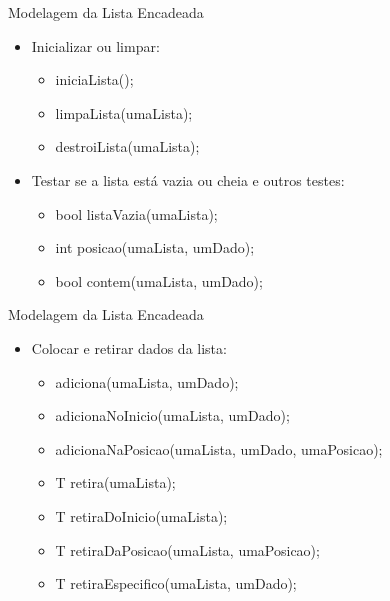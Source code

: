 \documentclass[12pt,table,xcolor={dvipsnames}]{beamer}
\begin{document}
\begin{frame}[fragile]{Modelagem da Lista Encadeada}

\begin{itemize}
\item Inicializar ou limpar:
\begin{itemize}
\item iniciaLista();
\item limpaLista(umaLista);
\item destroiLista(umaLista);
\end{itemize}
\item Testar se a lista está vazia ou cheia e outros testes:
\begin{itemize}
\item bool listaVazia(umaLista);
\item int posicao(umaLista, umDado);
\item bool contem(umaLista, umDado);
\end{itemize}
\end{itemize}
\end{frame}

\begin{frame}[fragile]{Modelagem da Lista Encadeada}

\begin{itemize}
\item Colocar e retirar dados da lista:
\begin{itemize}
\item adiciona(umaLista, umDado);
\item adicionaNoInicio(umaLista, umDado);
\item adicionaNaPosicao(umaLista, umDado, umaPosicao);
\item T retira(umaLista);
\item T retiraDoInicio(umaLista);
\item T retiraDaPosicao(umaLista, umaPosicao);
\item T retiraEspecifico(umaLista, umDado);
\end{itemize}
\end{itemize}
\end{frame}
\end{document}
